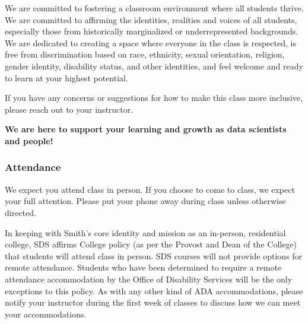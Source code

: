 \documentclass[
  letterpaper,
  DIV=11,
  numbers=noendperiod]{scrartcl}
\begin{document}
\begin{tcolorbox}[enhanced jigsaw, toptitle=1mm, toprule=.15mm, colframe=quarto-callout-tip-color-frame, colback=white, breakable, opacityback=0, opacitybacktitle=0.6, coltitle=black, rightrule=.15mm, bottomrule=.15mm, titlerule=0mm, leftrule=.75mm, colbacktitle=quarto-callout-tip-color!10!white, title=\textcolor{quarto-callout-tip-color}{\faLightbulb}\hspace{0.5em}{Inclusion policy}, left=2mm, arc=.35mm, bottomtitle=1mm]

We are committed to fostering a classroom environment where all students
thrive. We are committed to affirming the identities, realities and
voices of all students, especially those from historically marginalized
or underrepresented backgrounds. We are dedicated to creating a space
where everyone in the class is respected, is free from discrimination
based on race, ethnicity, sexual orientation, religion, gender identity,
disability status, and other identities, and feel welcome and ready to
learn at your highest potential.

If you have any concerns or suggestions for how to make this class more
inclusive, please reach out to your instructor.

\textbf{We are here to support your learning and growth as data
scientists and people!}

\end{tcolorbox}

\hypertarget{attendance}{%
\subsubsection{Attendance}\label{attendance}}

We expect you attend class in person. If you choose to come to class, we
expect your full attention. Please put your phone away during class
unless otherwise directed.

In keeping with Smith's core identity and mission as an in-person,
residential college, SDS affirms College policy (as per the Provost and
Dean of the College) that students will attend class in person. SDS
courses will not provide options for remote attendance. Students who
have been determined to require a remote attendance accommodation by the
Office of Disability Services will be the only exceptions to this
policy. As with any other kind of ADA accommodations, please notify your
instructor during the first week of classes to discuss how we can meet
your accommodations.
\end{document}
